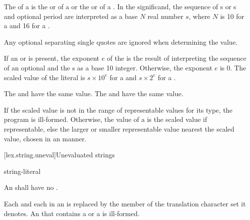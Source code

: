 \pnum
{}%
The  of a 
is the  or 
of a 
or the 
or 
of a .
In the significand,
the sequence of s or s
and optional period are interpreted as a base $N$ real number $s$,
where $N$ is 10 for a  and
16 for a .
\begin{note}
Any optional separating single quotes are ignored when determining the value.
\end{note}
If an  or 
is present,
the exponent $e$ of the 
is the result of interpreting
the sequence of an optional  and the s
as a base 10 integer.
Otherwise, the exponent $e$ is 0.
The scaled value of the literal is
$s \times 10^e$ for a  and
$s \times 2^e$ for a .
\begin{example}
The 
 and  have the same value.
The 
 and 
have the same value.
\end{example}

\pnum
If the scaled value is not in the range of representable
values for its type, the program is ill-formed.
Otherwise, the value of a 
is the scaled value if representable,
else the larger or smaller representable value nearest the scaled value,
chosen in an  manner.

[lex.string.uneval]{Unevaluated strings}

\begin{bnf}
\br
    string-literal
\end{bnf}

\pnum
An  shall have no .

\pnum
Each  and each  in an  is
replaced by the member of the translation character set it denotes.
An  that contains
a  or
a 
is ill-formed.

